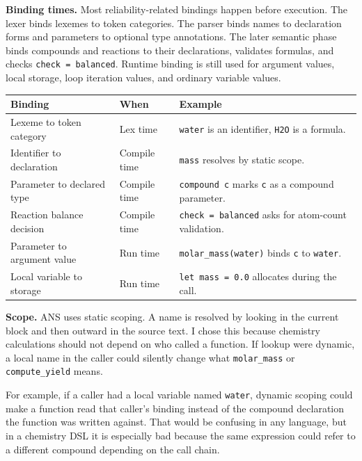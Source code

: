 \documentclass[11pt,a4paper]{article}
\newcommand{\code}[1]{\texttt{#1}}
\begin{document}
\textbf{Binding times.} Most reliability-related bindings happen before execution. The lexer
binds lexemes to token categories. The parser binds names to declaration forms and parameters
to optional type annotations. The later semantic phase binds compounds and reactions to their
declarations, validates formulas, and checks \code{check = balanced}. Runtime binding is still used
for argument values, local storage, loop iteration values, and ordinary variable values.

{\footnotesize
\begin{tabularx}{\linewidth}{@{}p{4.1cm}p{3.2cm}Y@{}}
\toprule
\textbf{Binding} & \textbf{When} & \textbf{Example} \\
\midrule
Lexeme to token category & Lex time & \code{water} is an identifier, \code{H2O} is a formula. \\
Identifier to declaration & Compile time & \code{mass} resolves by static scope. \\
Parameter to declared type & Compile time & \code{compound c} marks \code{c} as a compound parameter. \\
Reaction balance decision & Compile time & \code{check = balanced} asks for atom-count validation. \\
Parameter to argument value & Run time & \code{molar\_mass(water)} binds \code{c} to \code{water}. \\
Local variable to storage & Run time & \code{let mass = 0.0} allocates during the call. \\
\bottomrule
\end{tabularx}}

\textbf{Scope.} ANS uses static scoping. A name is resolved by looking in the current block and
then outward in the source text. I chose this because chemistry calculations should not depend
on who called a function. If lookup were dynamic, a local name in the caller could silently change
what \code{molar\_mass} or \code{compute\_yield} means.

For example, if a caller had a local variable named \code{water}, dynamic scoping could make a
function read that caller's binding instead of the compound declaration the function was written
against. That would be confusing in any language, but in a chemistry DSL it is especially bad
because the same expression could refer to a different compound depending on the call chain.
\end{document}
